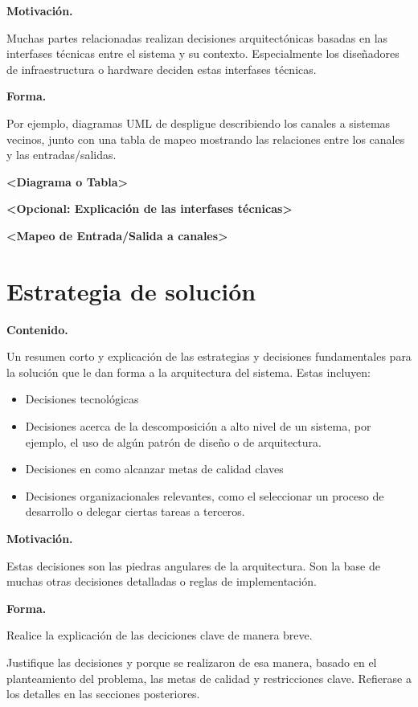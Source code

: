 \documentclass[]{article}
\begin{document}
\textbf{Motivación.}

Muchas partes relacionadas realizan decisiones arquitectónicas basadas
en las interfases técnicas entre el sistema y su contexto. Especialmente
los diseñadores de infraestructura o hardware deciden estas interfases
técnicas.

\textbf{Forma.}

Por ejemplo, diagramas UML de despligue describiendo los canales a
sistemas vecinos, junto con una tabla de mapeo mostrando las relaciones
entre los canales y las entradas/salidas.

\textbf{\textless{}Diagrama o Tabla\textgreater{}}

\textbf{\textless{}Opcional: Explicación de las interfases
técnicas\textgreater{}}

\textbf{\textless{}Mapeo de Entrada/Salida a canales\textgreater{}}

\hypertarget{section-solution-strategy}{%
\section{Estrategia de solución}\label{section-solution-strategy}}

\textbf{Contenido.}

Un resumen corto y explicación de las estrategias y decisiones
fundamentales para la solución que le dan forma a la arquitectura del
sistema. Estas incluyen:

\begin{itemize}
\item
  Decisiones tecnológicas
\item
  Decisiones acerca de la descomposición a alto nivel de un sistema, por
  ejemplo, el uso de algún patrón de diseño o de arquitectura.
\item
  Decisiones en como alcanzar metas de calidad claves
\item
  Decisiones organizacionales relevantes, como el seleccionar un proceso
  de desarrollo o delegar ciertas tareas a terceros.
\end{itemize}

\textbf{Motivación.}

Estas decisiones son las piedras angulares de la arquitectura. Son la
base de muchas otras decisiones detalladas o reglas de implementación.

\textbf{Forma.}

Realice la explicación de las deciciones clave de manera breve.

Justifique las decisiones y porque se realizaron de esa manera, basado
en el planteamiento del problema, las metas de calidad y restricciones
clave. Refierase a los detalles en las secciones posteriores.
\end{document}
